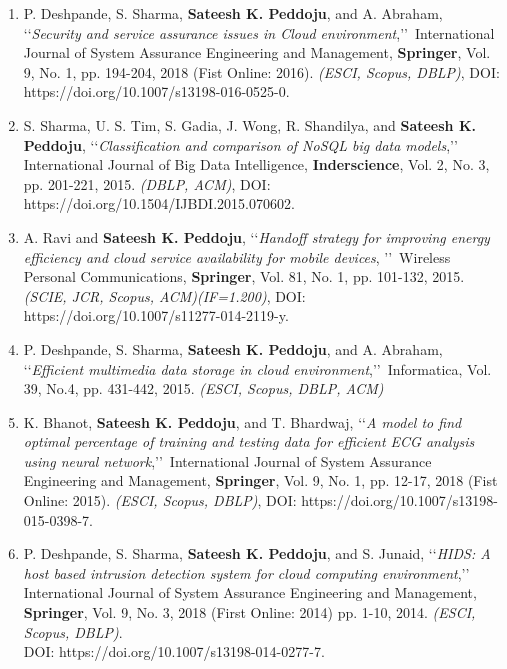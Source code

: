 \begin{enumerate}
	\item
	P. Deshpande, S. Sharma, \textbf{Sateesh K. Peddoju}, and A. Abraham, \lq\lq \textit{Security and service assurance issues in Cloud environment},\rq\rq\, International Journal of System Assurance Engineering and Management, \textbf{Springer}, Vol. 9, No. 1, pp. 194-204, 2018 (Fist Online: 2016). \emph{(ESCI, Scopus, DBLP)}, DOI: https://doi.org/10.1007/s13198-016-0525-0.
	
	\item
	S. Sharma, U. S. Tim, S. Gadia, J. Wong, R. Shandilya, and \textbf{Sateesh K. Peddoju}, \lq\lq \textit{Classification and comparison of NoSQL big data models},\rq\rq\, International Journal of Big Data Intelligence, \textbf{Inderscience}, Vol. 2, No. 3, pp. 201-221, 2015. \emph{(DBLP, ACM)}, DOI: https://doi.org/10.1504/IJBDI.2015.070602.
	
	
	\item
	A. Ravi and \textbf{Sateesh K. Peddoju}, \lq\lq \textit{Handoff strategy for improving energy efficiency and cloud service availability for mobile devices}, \rq\rq\, Wireless Personal Communications, \textbf{Springer}, Vol. 81, No. 1, pp. 101-132, 2015. \emph{(SCIE, JCR, Scopus, ACM)(IF=1.200)}, DOI: https://doi.org/10.1007/s11277-014-2119-y.
	
	
	\item
	P. Deshpande, S. Sharma, \textbf{Sateesh K. Peddoju}, and A. Abraham, \lq\lq \textit{Efficient multimedia data storage in cloud environment},\rq\rq\, Informatica, Vol. 39, No.4, pp. 431-442, 2015. \emph{(ESCI, Scopus, DBLP, ACM)}
	
	\item
	K. Bhanot, \textbf{Sateesh K. Peddoju}, and T. Bhardwaj, \lq\lq \textit{A model to find optimal percentage of training and testing data for efficient ECG analysis using neural network},\rq\rq\, International Journal of System Assurance Engineering and Management, \textbf{Springer}, Vol. 9, No. 1, pp. 12-17, 2018 (Fist Online: 2015). \emph{(ESCI, Scopus, DBLP)}, DOI: https://doi.org/10.1007/s13198-015-0398-7.
	
	\item
	P. Deshpande, S. Sharma, \textbf{Sateesh K. Peddoju}, and S. Junaid, \lq\lq \textit{HIDS: A host based intrusion detection system for cloud computing environment},\rq\rq\, International Journal of System Assurance Engineering and Management, \textbf{Springer}, Vol. 9, No. 3, 2018 (First Online: 2014) pp. 1-10, 2014. \emph{(ESCI, Scopus, DBLP)}. \\DOI: https://doi.org/10.1007/s13198-014-0277-7.
	
	
	
	
\end{enumerate}		
